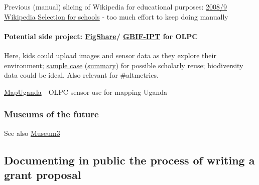 \documentclass[final,authoryear,3p]{elsarticle-open-drafting}
\begin{document}

Previous (manual) slicing of Wikipedia for educational purposes: \href{http://schools-wikipedia.org}{2008/9 Wikipedia Selection for schools} - too much effort to keep doing manually


\paragraph{Potential side project: \href{http://figshare.com/}{FigShare}/ \href{http://www.gbif.org/communications/news-and-events/showsingle/article/new-incentive-for-biodiversity-data-publishing/}{GBIF-IPT} for OLPC} 
Here, kids could upload images and sensor data as they explore their environment; \href{http://dx.doi.org/10.3897/zookeys.89.903}{sample case} (\href{http://www.eurekalert.org/pub_releases/2011-05/pp-snh051711.php}{summary}) for possible scholarly reuse; biodiversity data could be ideal. Also relevant for \#altmetrics.


\href{http://mapuganda.blogspot.com/}{MapUganda} - OLPC sensor use for mapping Uganda



\subsubsection{Museums of the future}
See also \href{http://museum3.org}{Museum3}
\subsection{Documenting in public the process of writing a grant proposal}
\end{document}
